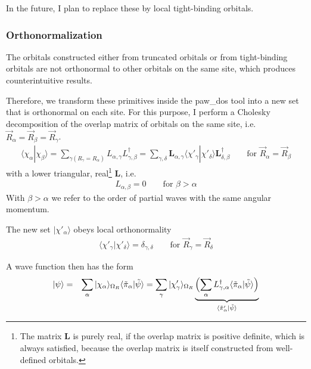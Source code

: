 \documentclass[final,12pt,makeidx,DIV=calc]{article}
\newcommand{\mat}[1]{\mathbf{#1}}
\begin{document}
{{{{{{In the future, I plan to replace these by local tight-binding orbitals.

\subsubsection{Orthonormalization}
The orbitals constructed either from truncated orbitals or from
tight-binding orbitals are not orthonormal to other orbitals on the
same site, which produces counterintuitive results.

Therefore, we transform these primitives inside the paw\_dos tool into
a new set that is orthonormal on each site. For this purpose, I
perform a Cholesky decomposition of the overlap matrix of orbitals on
the same site, i.e. $\vec{R}_{\alpha}=\vec{R}_\beta=\vec{R}_\gamma$.
\begin{eqnarray}
\langle\chi_\alpha|\chi_\beta\rangle
=\sum_{\gamma (R_\gamma=R_\alpha)}  L_{\alpha,\gamma}L^\dagger_{\gamma,\beta}
=\sum_{\gamma,\delta}\mat{L}_{\alpha,\gamma}
\langle\chi'_\gamma|\chi'_\delta\rangle
\mat{L}^\dagger_{\delta,\beta}
\qquad\text{for $\vec{R}_\alpha=\vec{R}_\beta$}
\end{eqnarray}
with a lower triangular, real\footnote{The matrix $\mat{L}$ is purely
  real, if the overlap matrix is positive definite, which is always
  satisfied, because the overlap matrix is itself constructed from
  well-defined orbitals.} $\mat{L}$, i.e.
\begin{eqnarray}
L_{\alpha,\beta}=0\qquad\text{for $\beta>\alpha$}
\end{eqnarray}
With $\beta>\alpha$ we refer to the order of partial waves with the
same angular momentum. 

The new set $|\chi'_\alpha\rangle$ obeys local orthonormality
\begin{eqnarray}
\langle\chi'_\gamma|\chi'_\delta\rangle=
\delta_{\gamma,\delta} \qquad\text{for $\vec{R}_\gamma=\vec{R}_\delta$}
\end{eqnarray}

A wave function then has the form
\begin{eqnarray}
|\psi\rangle
&=&\sum_{\alpha}
|\chi_\alpha\rangle_{\Omega_R}
\langle\tilde{\pi}_\alpha|\tilde\psi\rangle
=\sum_{\gamma}
|\chi'_\gamma\rangle_{\Omega_R}
\underbrace{\Bigl(
\sum_{\alpha}
L^\dagger_{\gamma,\alpha}
\langle\tilde{\pi}_\alpha|\tilde\psi\rangle
\Bigr)}_{\langle\tilde{\pi}'_\alpha|\tilde\psi\rangle}
\end{eqnarray}

}}}}}}
\end{document}
